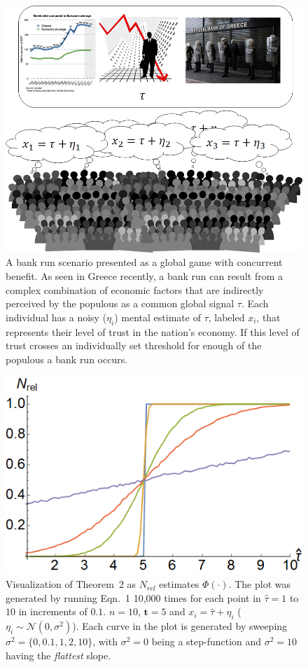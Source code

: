\documentclass[12pt]{article}
\def\td{\mathbf{t}}   %
\begin{document}
\newpage
\begin{figure}[!ht]
	\centering\includegraphics[width=\columnwidth]{figures/bankrun.png}
	\centering\caption{A bank run scenario presented as a global game with concurrent benefit. As seen in Greece recently, a bank run can result from a complex combination of economic factors that are indirectly perceived by the populous as a common global signal $\tau$. Each individual has a noisy ($\eta_i$) mental estimate of $\tau$, labeled $x_i$, that represents their level of trust in the nation's economy. If this level of trust crosses an individually set threshold for enough of the populous a bank run occurs.
}\label{fig:thm2fig}
\end{figure}

\newpage
\begin{figure}[!ht]
	\centering\includegraphics[width=\columnwidth]{figures/thm2fig.png}
	\centering\caption{Visualization of Theorem~2 as $N_{rel}$ estimates $\Phi(\cdot)$. The plot was generated by running Eqn.~1 10,000 times for each point in $\hat{\tau} = 1$ to $10$ in increments of $0.1$. $n = 10$, $\td = 5$ and $x_i = \hat{\tau} + \eta_i$ ($\eta_i \sim\mathcal{N}(0, \sigma^2)$). Each curve in the plot is generated by sweeping $\sigma^2 = \{0, 0.1, 1, 2, 10\}$, with $\sigma^2 = 0$ being a step-function and $\sigma^2 = 10$ having the \emph{flattest} slope.}\label{fig:thm2fig}
\end{figure}
\end{document}
